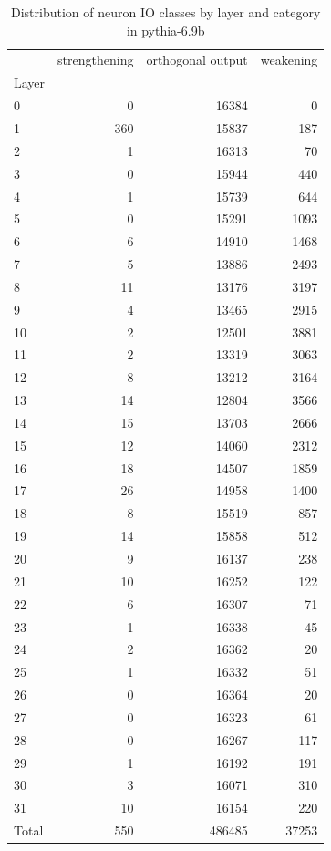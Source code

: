 \begin{table}
\caption{Distribution of neuron IO classes by layer and category in pythia-6.9b}
\label{tab:pythia-6.9b}
\begin{tabular}{lrrr}
 & strengthening & orthogonal output & weakening \\
Layer &  &  &  \\
0 & 0 & 16384 & 0 \\
1 & 360 & 15837 & 187 \\
2 & 1 & 16313 & 70 \\
3 & 0 & 15944 & 440 \\
4 & 1 & 15739 & 644 \\
5 & 0 & 15291 & 1093 \\
6 & 6 & 14910 & 1468 \\
7 & 5 & 13886 & 2493 \\
8 & 11 & 13176 & 3197 \\
9 & 4 & 13465 & 2915 \\
10 & 2 & 12501 & 3881 \\
11 & 2 & 13319 & 3063 \\
12 & 8 & 13212 & 3164 \\
13 & 14 & 12804 & 3566 \\
14 & 15 & 13703 & 2666 \\
15 & 12 & 14060 & 2312 \\
16 & 18 & 14507 & 1859 \\
17 & 26 & 14958 & 1400 \\
18 & 8 & 15519 & 857 \\
19 & 14 & 15858 & 512 \\
20 & 9 & 16137 & 238 \\
21 & 10 & 16252 & 122 \\
22 & 6 & 16307 & 71 \\
23 & 1 & 16338 & 45 \\
24 & 2 & 16362 & 20 \\
25 & 1 & 16332 & 51 \\
26 & 0 & 16364 & 20 \\
27 & 0 & 16323 & 61 \\
28 & 0 & 16267 & 117 \\
29 & 1 & 16192 & 191 \\
30 & 3 & 16071 & 310 \\
31 & 10 & 16154 & 220 \\
Total & 550 & 486485 & 37253 \\
\end{tabular}
\end{table}
